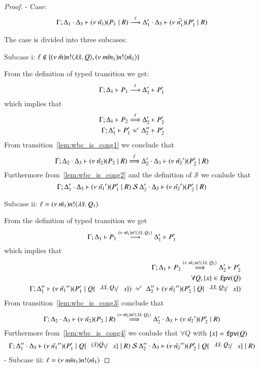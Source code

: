 \begin{proof}

	\noi - Case: 
	\[
		\Gamma; \Delta_1 \cdot \Delta_3 \vdash (\nu\ \tilde{n_1})(P_1 \;|\; R) \stackrel{\ell}{\longrightarrow} \Delta_1' \cdot \Delta_3 \vdash (\nu\ \tilde{n_1'})(P_1' \;|\; R)
	\]

	\noi The case is divided into three subcases:

	\noi Subcase i: $\ell \notin \{(\nu\ \tilde{m}) n ! \langle \lambda \tilde{x}.\,Q \rangle, (\nu\ \tilde{mm_1}) n ! \langle \tilde{m_1} \rangle\}$

	\noi From the definition of typed transition we get:
	\[
		\Gamma; \Delta_1 \vdash P_1 \stackrel{\ell}{\longrightarrow} \Delta_1' \vdash P_1'
	\]
	\noi which implies that
%
	\begin{eqnarray}
		\Gamma; \Delta_1 \vdash P_2 \stackrel{\ell}{\Longrightarrow} \Delta_2' \vdash P_2'
		\label{lem:wbc_is_cong1}\\
		\Gamma; \Delta_1' \vdash P_1' \approx^{c} \Delta_2'' \vdash P_2'
		\label{lem:wbc_is_cong2}
	\end{eqnarray}
%
	\noi From transition~\ref{lem:wbc_is_cong1} we conclude that 
	\[
		\Gamma; \Delta_2 \cdot \Delta_3 \vdash (\nu\ \tilde{n_2})(P_2 \;|\; R) \stackrel{\ell}{\Longrightarrow} \Delta_2' \cdot \Delta_3 \vdash (\nu\ \tilde{n_2}')(P_2' \;|\; R)
	\]
%
	\noi Furthermore from~\ref{lem:wbc_is_cong2} and the definition of $\mathcal{S}$ we conlude that
	\[
		\Gamma; \Delta_1' \cdot \Delta_3 \vdash (\nu\ \tilde{n_1}')(P_1' \;|\; R) \ \mathcal{S}\  \Delta_2' \cdot \Delta_3 \vdash (\nu\ \tilde{n_2}')(P_2' \;|\; R)
	\]

	\noi Subcase ii: $\ell = (\nu\ \tilde{m_1}) n ! \langle \lambda \tilde{x}.\,Q_1 \rangle$

	\noi From the definition of typed transition we get
	\[
		\Gamma; \Delta_1 \vdash P_1 \stackrel{(\nu\ \tilde{m_1}) n ! \langle \lambda \tilde{x}.\,Q_1 \rangle}{\longrightarrow} \Delta_1' \vdash P_1'
	\]
	\noi which implies that
%
	\begin{eqnarray}
		&& \horel{\Gamma}{\Delta_1}{P_2}{\By{\news{\tilde{m_2}} \bactout{n}{\abs{\tilde{x}}{Q_2}}}}{\Delta_2'}{P_2'}
		\label{lem:wbc_is_cong3} \\
		&&\forall Q, \set{x} \in \fpv{Q} \nonumber \\
		&& \horel{\Gamma}{\Delta_1''}{\newsp{\tilde{n_1}''}{P_1' \Par Q \subst{\abs{\tilde{x}}{Q_1}}{x}}}
		{\ \wbc\ }
		{\Delta_2''}{\newsp{\tilde{n_2}''}{P_2' \Par Q \subst{\abs{\tilde{x}}{Q_2}}{x}}}
		\label{lem:wbc_is_cong4}
	\end{eqnarray}
%
	\noi From transition~\ref{lem:wbc_is_cong3} conclude that 
	\[
		\Gamma; \Delta_2 \cdot \Delta_3 \vdash (\nu\ \tilde{n_2})(P_2 \;|\; R) \stackrel{(\nu\ \tilde{m_2}) n ! \langle \lambda \tilde{x}.\,Q_2 \rangle}{\Longrightarrow} \Delta_2' \cdot \Delta_3 \vdash (\nu\ \tilde{n_2}')(P_2' \;|\; R)
	\]
%
	\noi Furthermore from~\ref{lem:wbc_is_cong4} we conlude that $\forall Q$ with $\{x\} = \mathtt{fpv}(Q)$
%
	\[
		\horel{\Gamma}{\Delta_1'' \cat \Delta_3}{\newsp{\tilde{n_1}''}{P_1' \Par Q \subst{(\tilde{x}) Q_1}{x} \Par R}}{\ \mathcal{S}\ }{\Delta_2'' \cat \Delta_3}{\newsp{\tilde{n_2}''}{P_2' \Par Q \subst{\abs{\tilde{x}}{Q_2}}{x} \Par R}}
	\]
%
	- Subcase iii: $\ell = (\nu\ \tilde{mm_1}) n ! \langle \tilde{m_1} \rangle$


\end{proof}
